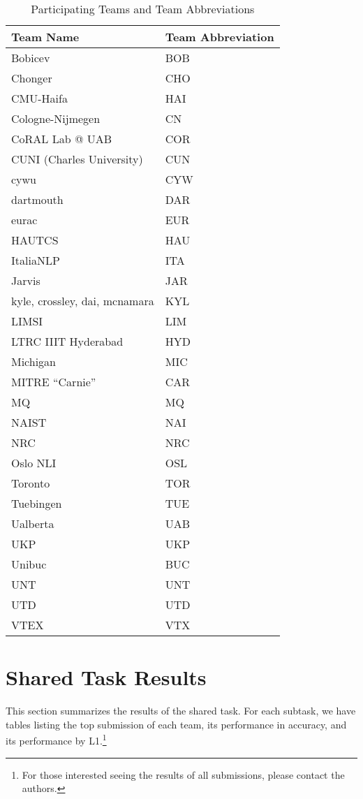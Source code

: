 \documentclass[11pt,letterpaper]{article}
\begin{document}
\begin{table*}[htbp]
\begin{center}
\begin{tabular}{|l|l|}
\hline
\textbf{Team Name} & \textbf{Team Abbreviation} \\ \hline
Bobicev & BOB  \\ \hline
Chonger & CHO  \\ \hline
CMU-Haifa & HAI  \\ \hline
Cologne-Nijmegen &  CN \\ \hline
CoRAL Lab @ UAB &  COR \\ \hline
CUNI (Charles University) &  CUN \\ \hline
cywu &  CYW \\ \hline
dartmouth & DAR  \\ \hline
eurac & EUR  \\ \hline
HAUTCS & HAU  \\ \hline
ItaliaNLP &  ITA \\ \hline
Jarvis &   JAR\\ \hline
kyle, crossley, dai, mcnamara & KYL  \\ \hline
LIMSI & LIM  \\ \hline
LTRC IIIT Hyderabad &  HYD \\ \hline
Michigan &  MIC \\ \hline
MITRE ``Carnie'' & CAR  \\ \hline
MQ &   MQ\\ \hline
NAIST &  NAI \\ \hline
NRC &  NRC \\ \hline
Oslo NLI & OSL  \\ \hline
Toronto &  TOR \\ \hline
Tuebingen &   TUE\\ \hline
Ualberta &  UAB \\ \hline
UKP &  UKP \\ \hline
Unibuc &  BUC \\ \hline
UNT &   UNT\\ \hline
UTD &  UTD \\ \hline
VTEX &  VTX \\ \hline

\end{tabular}
\end{center}
\caption{Participating Teams and Team Abbreviations\label{tab:teams}}
\end{table*}

\section{Shared Task Results}
\label{sec-results}
This section summarizes the results of the shared task.  For each subtask,
we have tables listing the top submission of each team, its performance in
accuracy, and its performance by L1.\footnote{For those interested seeing
the results of all submissions, please contact the authors.}
\end{document}
